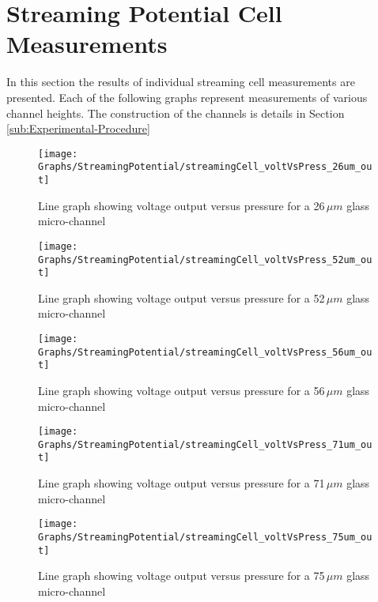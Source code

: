 
\section{\label{sec:Appendix-Streaming-Potential-Cell}Streaming Potential
Cell Measurements}

In this section the results of individual streaming cell measurements
are presented. Each of the following graphs represent measurements
of various channel heights. The construction of the channels is details
in Section \ref{sub:Experimental-Procedure}

\begin{figure}
\begin{centering}
\texttt{[image: Graphs/StreamingPotential/streamingCell\_voltVsPress\_26um\_out]}
\par\end{centering}

\protect\caption{Line graph showing voltage output versus pressure for a 26$\,\mu m$
glass micro-channel}


\end{figure}
\begin{figure}
\begin{centering}
\texttt{[image: Graphs/StreamingPotential/streamingCell\_voltVsPress\_52um\_out]}
\par\end{centering}

\protect\caption{Line graph showing voltage output versus pressure for a 52$\,\mu m$
glass micro-channel}
\end{figure}
\begin{figure}
\begin{centering}
\texttt{[image: Graphs/StreamingPotential/streamingCell\_voltVsPress\_56um\_out]}
\par\end{centering}

\protect\caption{Line graph showing voltage output versus pressure for a 56$\,\mu m$
glass micro-channel}
\end{figure}
\begin{figure}
\begin{centering}
\texttt{[image: Graphs/StreamingPotential/streamingCell\_voltVsPress\_71um\_out]}
\par\end{centering}

\protect\caption{Line graph showing voltage output versus pressure for a 71$\,\mu m$
glass micro-channel}
\end{figure}
\begin{figure}
\begin{centering}
\texttt{[image: Graphs/StreamingPotential/streamingCell\_voltVsPress\_75um\_out]}
\par\end{centering}

\protect\caption{Line graph showing voltage output versus pressure for a 75$\,\mu m$
glass micro-channel}
\end{figure}
